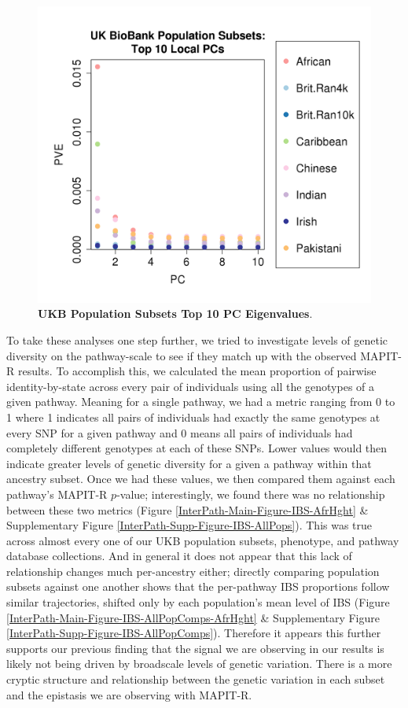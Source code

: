 \documentclass[12pt, a4paper]{article}
\begin{document}
\begin{figure}[htbp]
\centering
\includegraphics[scale=.5]{Images/Main/InterPath_Main_Figure_Eigenvalues_vs1.png}
\caption[TBD]{\textbf{UKB Population Subsets Top 10 PC Eigenvalues}.}
\label{InterPath-Main-Figure-Eigenvalues}
\end{figure}

To take these analyses one step further, we tried to investigate levels of genetic diversity on the pathway-scale to see if they match up with the observed MAPIT-R results. To accomplish this, we calculated the mean proportion of pairwise identity-by-state across every pair of individuals using all the genotypes of a given pathway. Meaning for a single pathway, we had a metric ranging from 0 to 1 where 1 indicates all pairs of individuals had exactly the same genotypes at every SNP for a given pathway and 0 means all pairs of individuals had completely different genotypes at each of these SNPs. Lower values would then indicate greater levels of genetic diversity for a given a pathway within that ancestry subset. Once we had these values, we then compared them against each pathway's MAPIT-R $p$-value; interestingly, we found there was no relationship between these two metrics (Figure \ref{InterPath-Main-Figure-IBS-AfrHght} \& Supplementary Figure \ref{InterPath-Supp-Figure-IBS-AllPops}). This was true across almost every one of our UKB population subsets, phenotype, and pathway database collections. And in general it does not appear that this lack of relationship changes much per-ancestry either; directly comparing population subsets against one another shows that the per-pathway IBS proportions follow similar trajectories, shifted only by each population's mean level of IBS (Figure \ref{InterPath-Main-Figure-IBS-AllPopComps-AfrHght} \& Supplementary Figure \ref{InterPath-Supp-Figure-IBS-AllPopComps}). Therefore it appears this further supports our previous finding that the signal we are observing in our results is likely not being driven by broadscale levels of genetic variation. There is a more cryptic structure and relationship between the genetic variation in each subset and the epistasis we are observing with MAPIT-R. 
\end{document}
